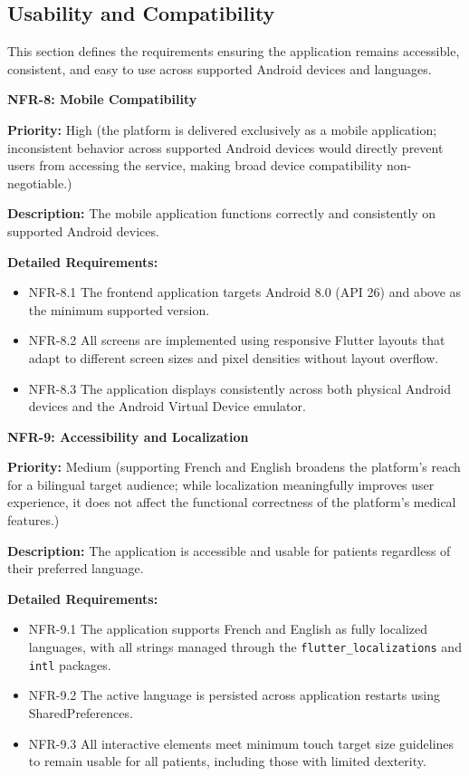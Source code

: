 \subsection{Usability and Compatibility}

This section defines the requirements ensuring the application remains accessible,
consistent, and easy to use across supported Android devices and languages.

\textbf{NFR-8: Mobile Compatibility}

\textbf{Priority:} High (the platform is delivered exclusively as a mobile application; inconsistent behavior across supported Android devices would directly prevent users from accessing the service, making broad device compatibility non-negotiable.)

\textbf{Description:} The mobile application functions correctly and consistently on
supported Android devices.

\textbf{Detailed Requirements:}
\begin{itemize}
    \item NFR-8.1 \; The frontend application targets Android 8.0 (API 26) and above as the minimum supported version.
    \item NFR-8.2 \; All screens are implemented using responsive Flutter layouts
    that adapt to different screen sizes and pixel densities without layout overflow.
    \item NFR-8.3 \; The application displays consistently across both physical Android
    devices and the Android Virtual Device emulator.
\end{itemize}

\medskip

\textbf{NFR-9: Accessibility and Localization}

\textbf{Priority:} Medium (supporting French and English broadens the platform's reach for a bilingual target audience; while localization meaningfully improves user experience, it does not affect the functional correctness of the platform's medical features.)

\textbf{Description:} The application is accessible and usable for patients regardless
of their preferred language.

\textbf{Detailed Requirements:}
\begin{itemize}
    \item NFR-9.1 \; The application supports French and English as fully localized
    languages, with all strings managed through the \texttt{flutter\_localizations}
    and \texttt{intl} packages.
    \item NFR-9.2 \; The active language is persisted across application restarts
    using SharedPreferences.
    \item NFR-9.3 \; All interactive elements meet minimum touch target size
    guidelines to remain usable for all patients, including those with limited
    dexterity.
\end{itemize}
